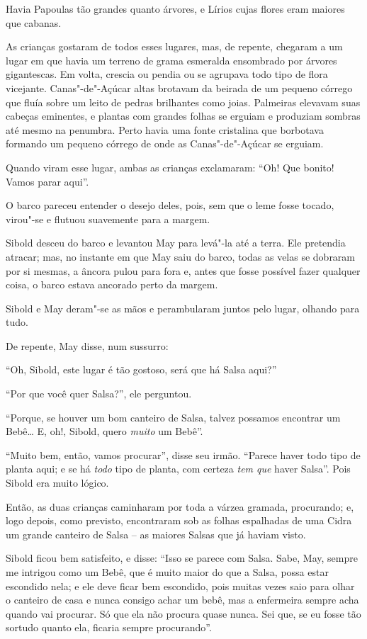 Havia Papoulas tão grandes quanto árvores, e Lírios cujas flores eram
maiores que cabanas.

As crianças gostaram de todos esses lugares, mas, de repente, chegaram a
um lugar em que havia um terreno de grama esmeralda ensombrado por
árvores gigantescas. Em volta, crescia ou pendia ou se agrupava todo
tipo de flora vicejante. Canas"-de"-Açúcar altas brotavam da beirada de um
pequeno córrego que fluía sobre um leito de pedras brilhantes como
joias. Palmeiras elevavam suas cabeças eminentes, e plantas com grandes
folhas se erguiam e produziam sombras até mesmo na penumbra. Perto havia
uma fonte cristalina que borbotava formando um pequeno córrego de onde
as Canas"-de"-Açúcar se erguiam.

Quando viram esse lugar, ambas as crianças exclamaram: ``Oh! Que bonito!
Vamos parar aqui''.

O barco pareceu entender o desejo deles, pois, sem que o leme fosse
tocado, virou"-se e flutuou suavemente para a margem.

Sibold desceu do barco e levantou May para levá"-la até a terra. Ele
pretendia atracar; mas, no instante em que May saiu do barco, todas as
velas se dobraram por si mesmas, a âncora pulou para fora e, antes que
fosse possível fazer qualquer coisa, o barco estava ancorado perto da
margem.

Sibold e May deram"-se as mãos e perambularam juntos pelo lugar, olhando
para tudo.

De repente, May disse, num sussurro:

``Oh, Sibold, este lugar é tão gostoso, será que há Salsa aqui?''

``Por que você quer Salsa?'', ele perguntou.

``Porque, se houver um bom canteiro de Salsa, talvez possamos encontrar
um Bebê… E, oh!, Sibold, quero \emph{muito} um Bebê''.

``Muito bem, então, vamos procurar'', disse seu irmão. ``Parece haver
todo tipo de planta aqui; e se há \emph{todo} tipo de planta, com
certeza \emph{tem que} haver Salsa''. Pois Sibold era muito lógico.

Então, as duas crianças caminharam por toda a várzea gramada,
procurando; e, logo depois, como previsto, encontraram sob as folhas
espalhadas de uma Cidra um grande canteiro de Salsa -- as maiores Salsas
que já haviam visto.

Sibold ficou bem satisfeito, e disse: ``Isso se parece com Salsa. Sabe,
May, sempre me intrigou como um Bebê, que é muito maior do que a Salsa,
possa estar escondido nela; e ele deve ficar bem escondido, pois muitas
vezes saio para olhar o canteiro de casa e nunca consigo achar um bebê,
mas a enfermeira sempre acha quando vai procurar. Só que ela não procura
quase nunca. Sei que, se eu fosse tão sortudo quanto ela, ficaria sempre
procurando''.

